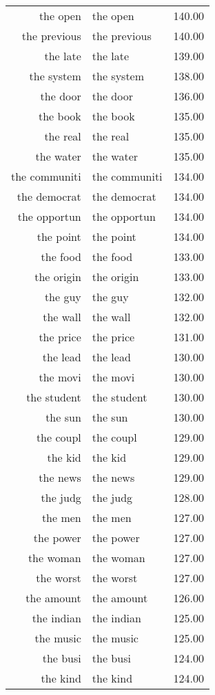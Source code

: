 \begin{table}[ht]
\begin{tabular}{rlr}
  the open & the open & 140.00 \\ 
  the previous & the previous & 140.00 \\ 
  the late & the late & 139.00 \\ 
  the system & the system & 138.00 \\ 
  the door & the door & 136.00 \\ 
  the book & the book & 135.00 \\ 
  the real & the real & 135.00 \\ 
  the water & the water & 135.00 \\ 
  the communiti & the communiti & 134.00 \\ 
  the democrat & the democrat & 134.00 \\ 
  the opportun & the opportun & 134.00 \\ 
  the point & the point & 134.00 \\ 
  the food & the food & 133.00 \\ 
  the origin & the origin & 133.00 \\ 
  the guy & the guy & 132.00 \\ 
  the wall & the wall & 132.00 \\ 
  the price & the price & 131.00 \\ 
  the lead & the lead & 130.00 \\ 
  the movi & the movi & 130.00 \\ 
  the student & the student & 130.00 \\ 
  the sun & the sun & 130.00 \\ 
  the coupl & the coupl & 129.00 \\ 
  the kid & the kid & 129.00 \\ 
  the news & the news & 129.00 \\ 
  the judg & the judg & 128.00 \\ 
  the men & the men & 127.00 \\ 
  the power & the power & 127.00 \\ 
  the woman & the woman & 127.00 \\ 
  the worst & the worst & 127.00 \\ 
  the amount & the amount & 126.00 \\ 
  the indian & the indian & 125.00 \\ 
  the music & the music & 125.00 \\ 
  the busi & the busi & 124.00 \\ 
  the kind & the kind & 124.00 \\ 

\end{tabular}
\end{table}

